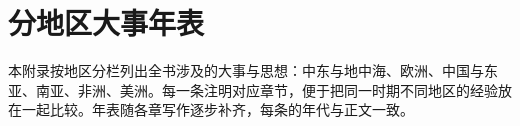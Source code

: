 \chapter{分地区大事年表}\label{app:timeline}

本附录按地区分栏列出全书涉及的大事与思想：中东与地中海、欧洲、中国与东亚、南亚、非洲、美洲。每一条注明对应章节，便于把同一时期不同地区的经验放在一起比较。年表随各章写作逐步补齐，每条的年代与正文一致。

\chapterstub
